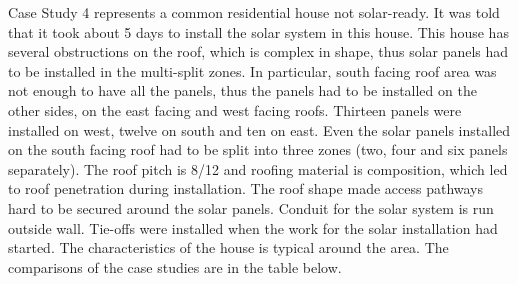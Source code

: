 \documentclass[]{article}
\begin{document}
Case Study 4 represents a common residential house not solar-ready. It
was told that it took about 5 days to install the solar system in this
house. This house has several obstructions on the roof, which is complex
in shape, thus solar panels had to be installed in the multi-split
zones. In particular, south facing roof area was not enough to have all
the panels, thus the panels had to be installed on the other sides, on
the east facing and west facing roofs. Thirteen panels were installed on
west, twelve on south and ten on east. Even the solar panels installed
on the south facing roof had to be split into three zones (two, four and
six panels separately). The roof pitch is 8/12 and roofing material is
composition, which led to roof penetration during installation. The roof
shape made access pathways hard to be secured around the solar panels.
Conduit for the solar system is run outside wall. Tie-offs were
installed when the work for the solar installation had started. The
characteristics of the house is typical around the area. The comparisons
of the case studies are in the table below.
\end{document}
